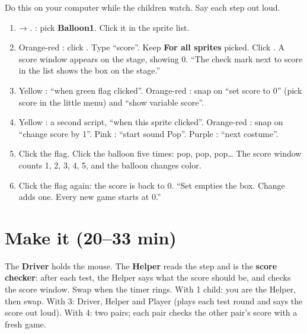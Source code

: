 \begin{workedexample}
Do this on your computer while the children watch. Say each step out loud.
\begin{enumerate}[leftmargin=1.4em,itemsep=1pt]
  \item {} → . : pick \textbf{Balloon1}. Click it in the sprite list.
  \item Orange-red : click . Type \enquote{score}. Keep \textbf{For all sprites} picked. Click . A score window appears on the stage, showing 0. \enquote{The check mark next to score in the list shows the box on the stage.}
  \item Yellow : \enquote{when green flag clicked}. Orange-red : snap on \enquote{set score to 0} (pick score in the little menu) and \enquote{show variable score}.
  \item Yellow : a second script, \enquote{when this sprite clicked}. Orange-red : snap on \enquote{change score by 1}. Pink : \enquote{start sound Pop}. Purple : \enquote{next costume}.
  \item Click the flag. Click the balloon five times: pop, pop, pop\ldots{} The score window counts 1, 2, 3, 4, 5, and the balloon changes color.
  \item Click the flag again: the score is back to 0. \enquote{Set empties the box. Change adds one. Every new game starts at 0.}
\end{enumerate}
\begin{center}
\begin{scratch}[scale=0.85]
\end{scratch}
\qquad
\begin{scratch}[scale=0.85]
\end{scratch}
\end{center}
\end{workedexample}

\section{Make it (20--33 min)}
\begin{pairroles}
The \textbf{Driver} holds the mouse. The \textbf{Helper} reads the step and is the \textbf{score checker}: after each test, the Helper says what the score should be, and checks the score window. Swap when the timer rings. With 1 child: you are the Helper, then swap. With 3: Driver, Helper and Player (plays each test round and says the score out loud). With 4: two pairs; each pair checks the other pair's score with a fresh game.
\end{pairroles}

